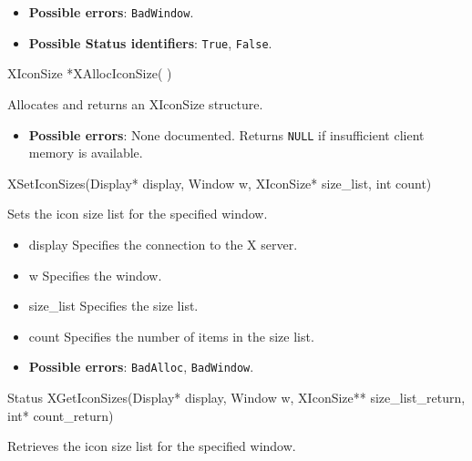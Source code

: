 \documentclass{report}
\begin{document}
\begin{itemize}
            \begin{itemize}
                \item \textbf{Possible errors}: \texttt{BadWindow}.
                \item \textbf{Possible Status identifiers}: \texttt{True}, \texttt{False}.
            \end{itemize}

            \begin{cppcode}
            XIconSize *XAllocIconSize( )
            \end{cppcode}
            \bigbreak \noindent
            Allocates and returns an XIconSize structure.

            \begin{itemize}
                \item \textbf{Possible errors}: None documented. Returns \texttt{NULL} if insufficient client memory is available.
            \end{itemize}

            \begin{cppcode}
                XSetIconSizes(Display* display, Window w, XIconSize* size_list, int count)
            \end{cppcode}
            \bigbreak \noindent
            Sets the icon size list for the specified window.

            \begin{itemize}
                \item display Specifies the connection to the X server.
                \item w Specifies the window.
                \item size\_list Specifies the size list.
                \item count Specifies the number of items in the size list.
            \end{itemize}

            \begin{itemize}
                \item \textbf{Possible errors}: \texttt{BadAlloc}, \texttt{BadWindow}.
            \end{itemize}

            \begin{cppcode}
                Status XGetIconSizes(Display* display, Window w, XIconSize** size_list_return, int* count_return)
            \end{cppcode}
            \bigbreak \noindent
            Retrieves the icon size list for the specified window.


\end{itemize}
\end{document}
